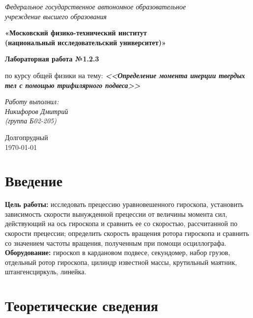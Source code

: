 \documentclass[a4paper,14pt]{extarticle}
\begin{document}
	\begin{center}
		\textit{Федеральное государственное автономное образовательное\\ учреждение высшего образования }
		
		\vspace{0.5ex}
		
		\textbf{«Московский физико-технический институт\\ (национальный исследовательский университет)»}
	\end{center}
	
	\vspace{10ex}
	
	
	\begin{center}
		\vspace{13ex}	
		\textbf{Лабораторная работа №1.2.3}	
		\vspace{1ex}
		
		по курсу общей физики		
		на тему:		
		\textbf{\textit{<<Определение момента инерции твердых тел с помощью трифилярного подвеса>>}}		
		\vspace{30ex}
		
		\begin{flushright}
			\noindent
			\textit{Работу выполнил:}\\  
			\textit{Никифоров Дмитрий \\(группа Б02-205)}
		\end{flushright}
		\vfill
		Долгопрудный \\ \today
		
	\end{center}
	\newpage
	
	\section{Введение}
	
	\textbf{Цель работы:} исследовать прецессию уравновешенного гироскопа, установить зависимость скорости вынужденной прецессии от величины момента сил, действующий на ось гироскопа и сравнить ее со скоростью, рассчитанной по скорости прецессии; определить скорость вращения ротора гироскопа и сравнить со значением частоты вращения, полученным при помощи осциллографа.\\
	\textbf{Оборудование:} гироскоп в кардановом подвесе, секундомер, набор грузов, отдельный ротор гироскопа, цилиндр известной массы, крутильный маятник, штангенсциркуль, линейка.
	
	\section{Теоретические сведения}
	
\end{document}
